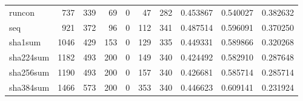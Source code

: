 \begin{longtable}{lrrrrrrrrr}
runcon    &                                                737 &                                                339 &                                                 69 &                                                  0 &                                                 47 &                                                282 &                                           0.453867 &                               0.540027 &                             0.382632 \\
seq       &                                                921 &                                                372 &                                                 96 &                                                  0 &                                                112 &                                                341 &                                           0.487514 &                               0.596091 &                             0.370250 \\
sha1sum   &                                               1046 &                                                429 &                                                153 &                                                  0 &                                                129 &                                                335 &                                           0.449331 &                               0.589866 &                             0.320268 \\
sha224sum &                                               1182 &                                                493 &                                                200 &                                                  0 &                                                149 &                                                340 &                                           0.424492 &                               0.582910 &                             0.287648 \\
sha256sum &                                               1190 &                                                493 &                                                200 &                                                  0 &                                                157 &                                                340 &                                           0.426681 &                               0.585714 &                             0.285714 \\
sha384sum &                                               1466 &                                                573 &                                                200 &                                                  0 &                                                353 &                                                340 &                                           0.446623 &                               0.609141 &                             0.231924 \\

\end{longtable}
